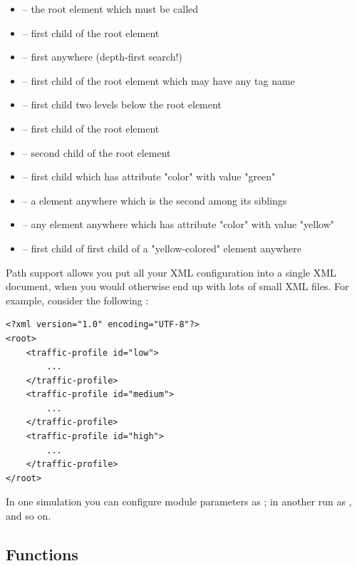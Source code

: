 \begin{itemize}
  \item {} -- the root element which must be called 
  \item {} -- first  child of the  root element
  \item {} -- first  anywhere (depth-first search!)
  \item {} -- first  child of the root element which may have any tag name
  \item {} -- first  child two levels below the root element
  \item {} -- first  child of the root element
  \item {} -- second  child of the root element
  \item {} -- first  child which has attribute "color" with value "green"
  \item {} -- a  element anywhere which is the second  among its siblings
  \item \ttt{//*[@color='yellow']} -- any element anywhere which has attribute "color" with value "yellow"
  \item {} -- first  child of first  child of a "yellow-colored" element anywhere
\end{itemize}

Path support allows you put all your XML configuration into
a single XML document, when you would otherwise end up with lots
of small XML files. For example, consider the following :

\begin{verbatim}
<?xml version="1.0" encoding="UTF-8"?>
<root>
    <traffic-profile id="low">
        ...
    </traffic-profile>
    <traffic-profile id="medium">
        ...
    </traffic-profile>
    <traffic-profile id="high">
        ...
    </traffic-profile>
</root>
\end{verbatim}

In one simulation you can configure module parameters as
;
in another run as
,
and so on.


\subsection{Functions}

